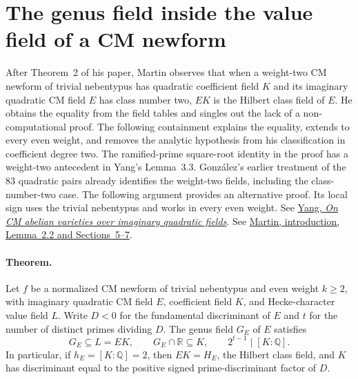 \section{The genus field inside the value field of a CM newform}
\label{sec:genus}

After Theorem~2 of his paper, Martin observes that when a weight-two CM newform of trivial nebentypus has quadratic coefficient field $K$ and its imaginary quadratic CM field $E$ has class number two, $EK$ is the Hilbert class field of $E$. He obtains the equality from the field tables and singles out the lack of a non-computational proof. The following containment explains the equality, extends to every even weight, and removes the analytic hypothesis from his classification in coefficient degree two. The ramified-prime square-root identity in the proof has a weight-two antecedent in Yang's Lemma~3.3. Gonz\'alez's earlier treatment of the 83 quadratic pairs already identifies the weight-two fields, including the class-number-two case. The following argument provides an alternative proof. Its local sign uses the trivial nebentypus and works in every even weight. See \href{https://arxiv.org/pdf/math/0301306}{Yang, \emph{On CM abelian varieties over imaginary quadratic fields}}. See \href{https://arxiv.org/html/2509.24119v2}{Martin, introduction, Lemma~2.2 and Sections~5--7}.

\paragraph{Theorem.} Let $f$ be a normalized CM newform of trivial nebentypus and even weight $k\ge2$, with imaginary quadratic CM field $E$, coefficient field $K$, and Hecke-character value field $L$. Write $D<0$ for the fundamental discriminant of $E$ and $t$ for the number of distinct primes dividing $D$. The genus field $G_E$ of $E$ satisfies
\[
        G_E\subseteq L=EK,\qquad G_E\cap\mathbb R\subseteq K,
        \qquad 2^{t-1}\mid[K:\mathbb Q].
\]
In particular, if $h_E=[K:\mathbb Q]=2$, then $EK=H_E$, the Hilbert class field, and $K$ has discriminant equal to the positive signed prime-discriminant factor of $D$.

